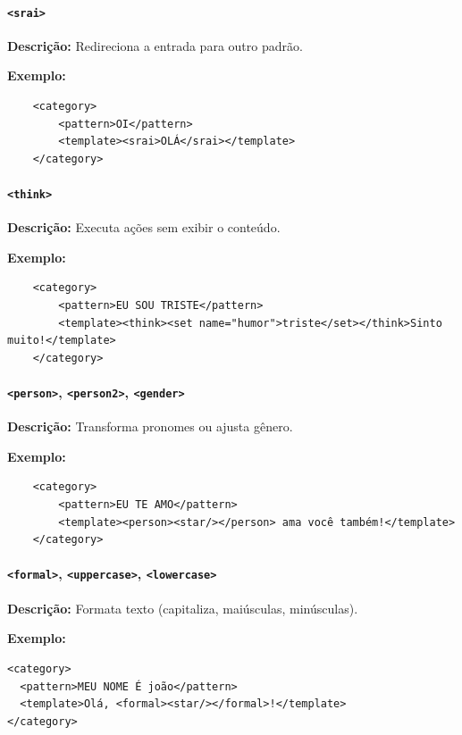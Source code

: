 \documentclass[a4paper,oneside]{book}
\begin{document}
\paragraph{\texttt{<srai>}} 

\textbf{Descrição:} Redireciona a entrada para outro padrão. 

\textbf{Exemplo:}

\begin{verbatim}
	<category>
		<pattern>OI</pattern>
		<template><srai>OLÁ</srai></template>
	</category>
\end{verbatim}

\paragraph{\texttt{<think>}} 

\textbf{Descrição:} Executa ações sem exibir o conteúdo. 

\textbf{Exemplo:}

\begin{verbatim}
	<category>
		<pattern>EU SOU TRISTE</pattern>
		<template><think><set name="humor">triste</set></think>Sinto muito!</template>
	</category>
\end{verbatim}

\paragraph{\texttt{<person>}, \texttt{<person2>}, \texttt{<gender>}} 

\textbf{Descrição:} Transforma pronomes ou ajusta gênero. 

\textbf{Exemplo:}

\begin{verbatim}
	<category>
		<pattern>EU TE AMO</pattern>
		<template><person><star/></person> ama você também!</template>
	</category>
\end{verbatim}

\paragraph{\texttt{<formal>}, \texttt{<uppercase>}, \texttt{<lowercase>}} 

\textbf{Descrição:} Formata texto (capitaliza, maiúsculas, minúsculas). 

\textbf{Exemplo:}

\begin{verbatim}
<category>
  <pattern>MEU NOME É joão</pattern>
  <template>Olá, <formal><star/></formal>!</template>
</category>
\end{verbatim}
\end{document}
